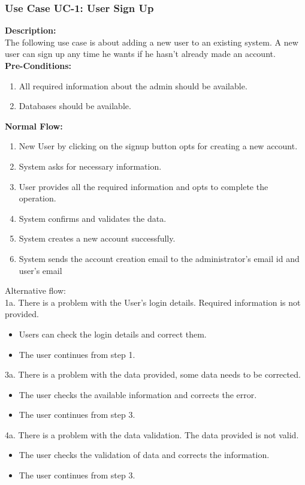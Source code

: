 \subsubsection{Use Case UC-1: User Sign Up}
\textbf{Description:}\\
The following use case is about adding a new user to an existing system. A new user can sign up any time he wants if he hasn’t already made an account. 
\\
\textbf{Pre-Conditions:}
\begin{enumerate}
    \item  All required information about the admin should be available.
    \item Databases should be available.
\end{enumerate}
\textbf{Normal Flow:}\\
\begin{enumerate}
\item  New User by clicking on the signup button opts for creating a new account.
\item  System asks for necessary information. 
\item  User provides all the required information and opts to complete the operation.
\item  System confirms and validates the data. 
\item  System creates a new account successfully. 
\item  System sends the account creation email to the administrator’s email id and user’s email
\end{enumerate}
Alternative flow: \\
1a. There is a problem with the User’s login details. Required information is not provided.
\begin{itemize}
    \item 	Users can check the login details and correct them.
     \item The user continues from step 1. 
\end{itemize}
3a. There is a problem with the data provided, some data needs to be corrected.
\begin{itemize}
    \item The user checks the available information and corrects the error. 
     \item The user continues from step 3. 
\end{itemize}	
	4a. There is a problem with the data validation. The data provided is not valid.  
	 \begin{itemize}
    \item 	The user checks the validation of data and corrects the information.
     \item 	The user continues from step 3. 
\end{itemize}	

